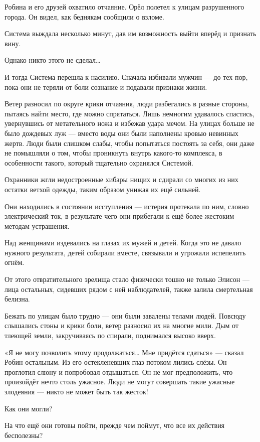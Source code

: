 \documentclass[a5paper, 9pt,
final, openany, twoside=true]{memoir}
\begin{document}
Робина и его друзей охватило отчаяние. Орёл полетел к улицам разрушенного города. Он видел, как беднякам сообщили о взломе.

Система выждала несколько минут, дав им возможность выйти вперёд и признать вину.

Однако никто этого не сделал…

И тогда Система перешла к насилию. Сначала избивали мужчин — до тех пор, пока они не теряли от боли сознание и подавали признаки жизни.

Ветер разносил по округе крики отчаяния, люди разбегались в разные стороны, пытаясь найти место, где можно спрятаться. Лишь немногим удавалось спастись, увернувшись от метательного ножа и избежав удара мечом. На улицах больше не было дождевых луж — вместо воды они были наполнены кровью невинных жертв. Люди были слишком слабы, чтобы попытаться постоять за себя, они даже не помышляли о том, чтобы проникнуть внутрь какого-то комплекса, в особенности такого, который тщательно охранялся Системой.\bigskip

Охранники жгли недостроенные хибары нищих и сдирали со многих из них остатки ветхой одежды, таким образом унижая их ещё сильней.

Они находились в состоянии исступления — истерия протекала по ним, словно электрический ток, в результате чего они прибегали к ещё более жестоким методам устрашения.

Над женщинами издевались на глазах их мужей и детей. Когда это не давало нужного результата, детей собирали вместе, связывали и угрожали испепелить огнём.

От этого отвратительного зрелища стало физически тошно не только Элисон — лица остальных, сидевших рядом с ней наблюдателей, также залила смертельная белизна.\bigskip

Бежать по улицам было трудно — они были завалены телами людей. Повсюду слышались стоны и крики боли, ветер разносил их на многие мили. Дым от тлеющей земли, закручиваясь по спирали, поднимался высоко вверх.

«Я не могу позволить этому продолжаться… Мне придётся сдаться» — сказал Робин остальным. Из его остекленевших глаз потоком лились слёзы. Он проглотил слюну и попробовал отдышаться. Он не мог предположить, что произойдёт нечто столь ужасное. Люди не могут совершать такие ужасные злодеяния — никто не может быть так жесток!

Как они могли?

На что ещё они готовы пойти, прежде чем поймут, что все их действия бесполезны?\bigskip
\end{document}
